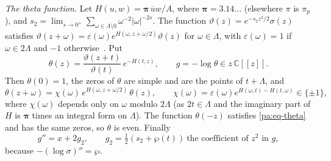 \documentclass[10pt]{amsart}
\theoremstyle{definition}
\theoremstyle{remark}
\newcommand{\C}{\mathbb C}
\providecommand{\aubar}[1]{\overline{#1}}
\begin{document}
\emph{The theta function.} Let $H(u,w)=\boldsymbol\pi\,\aubar uw/A$, where
$\boldsymbol\pi=3.14\ldots$ (elsewhere $\pi$ is $\pi_p$), and $s_2=\lim_{s\to0^+}\sum_{\omega\in\Lambda\setminus0}\omega^{-2}
|\omega|^{-2s}$. The function $\vartheta(z)=e^{-s_2z^2/2}\sigma(z)$ satisfies
$\vartheta(z+\omega)=\varepsilon(\omega)e^{H(\omega,z+\omega/2)}\vartheta(z)$ for $\omega\in\Lambda$,
with $\varepsilon(\omega)=1$ if $\omega\in2\Lambda$ and $-1$ otherwise~\cite[\S1.2]{BannaiKobayashi}.
Put
\[
\theta(z)=\frac{\vartheta(z+t)}{\vartheta(t)}\,e^{-H(t,z)},\qquad g=-\log\theta\in z\,\C[[z]].
\]
Then $\theta(0)=1$, the zeros of $\theta$ are simple and are the points of $t+\Lambda$, and
\begin{equation}\label{pa:eq-theta}
\theta(z+\omega)=\chi(\omega)\,e^{H(\omega,z+\omega/2)}\,\theta(z),\qquad
\chi(\omega)=\varepsilon(\omega)e^{H(\omega,t)-H(t,\omega)}\in\{\pm1\},
\end{equation}
where $\chi(\omega)$ depends only on $\omega$ modulo $2\Lambda$ (as $2t\in\Lambda$ and the
imaginary part of $H$ is $\boldsymbol\pi$ times an integral form on $\Lambda$). The function
$\theta(-z)$ satisfies \eqref{pa:eq-theta} and has the same zeros, so $\theta$ is even. Finally
\begin{equation}\label{pa:eq-g2}
g''=x+2g_2,\qquad g_2=\tfrac12(s_2+\wp(t))\ \text{the coefficient of }z^2\text{ in }g,
\end{equation}
because $-(\log\sigma)''=\wp$.
\end{document}
